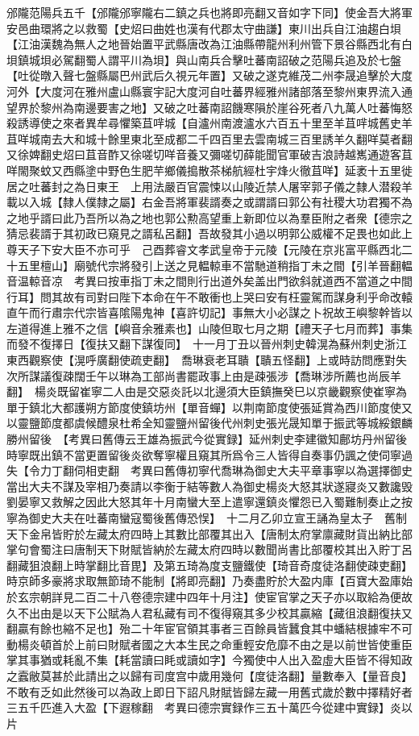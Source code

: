 邠隴范陽兵五千【邠隴邠寧隴右二鎮之兵也將即亮翻又音如字下同】使金吾大將軍安邑曲環將之以救蜀【史炤曰曲姓也漢有代郡太守曲謙】東川出兵自江油趨白垻【江油漢魏為無人之地晉始置平武縣唐改為江油縣帶龍州利州管下景谷縣西北有白垻鎮城垻必駕翻蜀人謂平川為垻】與山南兵合擊吐蕃南詔破之范陽兵追及於七盤【吐從暾入聲七盤縣屬巴州武后久視元年置】又破之遂克維茂二州李晟追擊於大度河外【大度河在雅州盧山縣寰宇記大度河自吐蕃界經雅州諸部落至黎州東界流入通望界於黎州為南邊要害之地】又破之吐蕃南詔饑寒隕於崖谷死者八九萬人吐蕃悔怒殺誘導使之來者異牟尋懼築苴哶城【自瀘州南渡瀘水六百五十里至羊苴哶城舊史羊苴咩城南去大和城十餘里東北至成都二千四百里去雲南城三百里誘羊久翻咩莫者翻又徐婢翻史炤曰苴音酢又徐嗟切咩音養又彌嗟切薛能聞官軍破吉浪詩越嶲通遊客苴咩閙聚蚊又西縣塗中野色生肥芉鄉儀搗散茶梯航經杜宇烽火徹苴咩】延袤十五里徙居之吐蕃封之為日東王　上用法嚴百官震悚以山陵近禁人屠宰郭子儀之隸人潜殺羊載以入城【隸人僕隸之屬】右金吾將軍裴諝奏之或謂諝曰郭公有社稷大功君獨不為之地乎諝曰此乃吾所以為之地也郭公勲高望重上新即位以為羣臣附之者衆【德宗之猜忌裴諝于其初政已窺見之諝私呂翻】吾故發其小過以明郭公威權不足畏也如此上尊天子下安大臣不亦可乎　己酉葬睿文孝武皇帝于元陵【元陵在京兆富平縣西北二十五里檀山】廟號代宗將發引上送之見輼輬車不當馳道稍指丁未之間【引羊晉翻輼音温輬音凉　考異曰按車指丁未之間則行出道外矣盖出門欲斜就道西不當道之中間行耳】問其故有司對曰陛下本命在午不敢衝也上哭曰安有枉靈駕而謀身利乎命改轅直午而行肅宗代宗皆喜隂陽鬼神【喜許切記】事無大小必謀之卜祝故王嶼黎幹皆以左道得進上雅不之信【嶼音余雅素也】山陵但取七月之期【禮天子七月而葬】事集而發不復擇日【復扶又翻下謀復同】　十一月丁丑以晉州刺史韓滉為蘇州刺史浙江東西觀察使【滉呼廣翻使疏吏翻】　喬琳衰老耳聵【聵五怪翻】上或時訪問應對失次所謀議復疎闊壬午以琳為工部尚書罷政事上由是疎張涉【喬琳涉所薦也尚辰羊翻】　楊炎既留崔寧二人由是交惡炎託以北邊須大臣鎮撫癸巳以京畿觀察使崔寧為單于鎮北大都護朔方節度使鎮坊州【單音蟬】以荆南節度使張延賞為西川節度使又以靈鹽節度都虞候醴泉杜希全知靈鹽州留後代州刺史張光晟知單于振武等城綏銀麟勝州留後　【考異曰舊傳云王雄為振武今從實録】延州刺史李建徽知鄜坊丹州留後時寧既出鎮不當更置留後炎欲奪寧權且窺其所爲令三人皆得自奏事仍諷之使伺寧過失【令力丁翻伺相吏翻　考異曰舊傳初寧代喬琳為御史大夫平章事寧以為選擇御史當出大夫不謀及宰相乃奏請以李衡于結等數人為御史楊炎大怒其狀遂寢炎又數讒毁劉晏寧又救解之因此大怒其年十月南蠻大至上遣寧還鎮炎懼怨已入蜀難制奏止之按寧為御史大夫在吐蕃南蠻寇蜀後舊傳恐悮】　十二月乙卯立宣王誦為皇太子　舊制天下金帛皆貯於左藏太府四時上其數比部覆其出入【唐制太府掌廪藏財貨出納比部掌句會蜀注曰唐制天下財賦皆納於左藏太府四時以數聞尚書比部覆校其出入貯丁呂翻藏狙浪翻上時掌翻比音毘】及第五琦為度支鹽鐵使【琦音奇度徒洛翻使疎吏翻】時京師多豪將求取無節琦不能制【將即亮翻】乃奏盡貯於大盈内庫【百寶大盈庫始於玄宗朝詳見二百二十八卷德宗建中四年十月注】使宦官掌之天子亦以取給為便故久不出由是以天下公賦為人君私藏有司不復得窺其多少校其贏縮【藏徂浪翻復扶又翻贏有餘也縮不足也】殆二十年宦官領其事者三百餘員皆蠶食其中蟠結根據牢不可動楊炎頓首於上前曰財賦者國之大本生民之命重輕安危靡不由之是以前世皆使重臣掌其事猶或耗亂不集【耗當讀曰眊或讀如字】今獨使中人出入盈虛大臣皆不得知政之蠧敝莫甚於此請出之以歸有司度宫中歲用幾何【度徒洛翻】量數奉入【量音良】不敢有乏如此然後可以為政上即日下詔凡財賦皆歸左藏一用舊式歲於數中擇精好者三五千匹進入大盈【下遐稼翻　考異曰德宗實録作三五十萬匹今從建中實録】炎以片